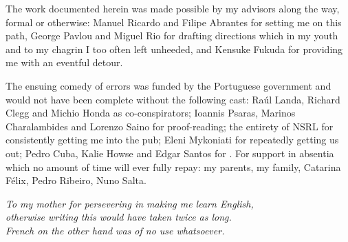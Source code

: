 \begin{acknowledgements}

The work documented herein was made possible by my advisors along the way, formal or otherwise: Manuel Ricardo and Filipe Abrantes for setting me on this path, George Pavlou and Miguel Rio for drafting directions which in my youth and to my chagrin I too often left unheeded, and Kensuke Fukuda for providing me with an eventful detour.

The ensuing comedy of errors was funded by the Portuguese government and would not have been complete without the following cast: 
Ra\'{u}l Landa, Richard Clegg and Michio Honda as co-conspirators; 
Ioannis Psaras, Marinos Charalambides and Lorenzo Saino for proof-reading; 
the entirety of NSRL for consistently getting me into the pub;
Eleni Mykoniati for repeatedly getting us out;
Pedro Cuba, Kalie Howse and Edgar Santos for .
For support in absentia which no amount of time will ever fully repay: my parents, my family, Catarina F\'{e}lix, Pedro Ribeiro, Nuno Salta.

\end{acknowledgements}

\newpage
\hphantom{}\vfill
\thispagestyle{empty}
\vspace*{1.75in}
\begin{flushright} 
\textit{
To my mother for persevering in making me learn English, \\
otherwise writing this would have taken twice as long. \\
French on the other hand was of no use whatsoever. \\
}
\end{flushright}



